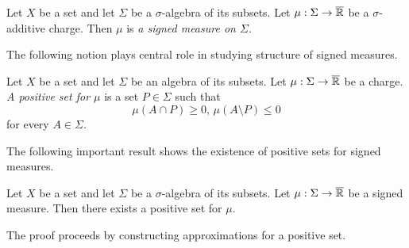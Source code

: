 \begin{definition}
    Let $X$ be a set and let $\Sigma$ be a $\sigma$-algebra of its subsets. Let $\mu:\Sigma \rightarrow \overline{{\mathbb R}}$ be a $\sigma$-additive charge. Then $\mu$ is \textit{a signed measure on $\Sigma$}.
\end{definition}
\noindent
The following notion plays central role in studying structure of signed measures.

\begin{definition}
    Let $X$ be a set and let $\Sigma$ be an algebra of its subsets. Let $\mu:\Sigma \rightarrow \overline{{\mathbb R}}$ be a charge. \textit{A positive set for $\mu$} is a set $P \in \Sigma$ such that
    $$\mu(A\cap P) \geq 0,\,\mu(A\setminus P)\leq 0$$
    for every $A \in \Sigma$.
\end{definition}
\noindent
The following important result shows the existence of positive sets for signed measures.

\begin{theorem}[Hahn]\label{theorem:Hahn_decomposition}
    Let $X$ be a set and let $\Sigma$ be a $\sigma$-algebra of its subsets. Let $\mu:\Sigma \rightarrow \overline{{\mathbb R}}$ be a signed measure. Then there exists a positive set for $\mu$.
\end{theorem}
\noindent
The proof proceeds by constructing approximations for a positive set.

